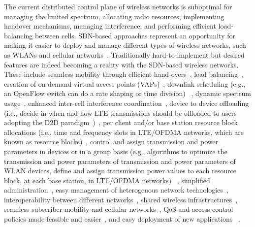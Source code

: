 The current distributed control plane of wireless networks is suboptimal for managing the limited 
spectrum, allocating radio resources, implementing handover mechanisms, managing interference, and performing efficient load-balancing between cells.
SDN-based approaches represent an opportunity for making it easier to deploy and manage different types of wireless networks, such as WLANs and cellular 
networks~\cite{schulz-zander2014-atc,yap2010-1,ali-ahmad2013,gudipati2013,li2012,jin2013}.
Traditionally hard-to-implement but desired features are indeed becoming a reality with the SDN-based wireless networks. 
These include seamless mobility through efficient hand-overs~\cite{schulz-zander2014-atc,dely2011,li2012}, load balancing~\cite{schulz-zander2014-atc,gudipati2013}, creation of on-demand virtual access points (VAPs)~\cite{schulz-zander2014-atc,vestin2013}, downlink scheduling (e.g., an OpenFlow switch can do a rate shaping or time division) ~\cite{vestin2013}, dynamic spectrum usage~\cite{vestin2013}, enhanced inter-cell 
interference coordination~\cite{vestin2013,li2012}, device to device offloading (i.e., decide in when and how LTE transmissions should be offloaded to users adopting the D2D paradigm~\cite{yang2013d2d})~\cite{ali-ahmad2013}, per client and/or base station resource block allocations (i.e.,  time and frequency slots in LTE/OFDMA networks, which are known as resource blocks)~\cite{gudipati2013,ali-ahmad2013,jin2013}, control and assign 
transmission and power parameters in devices or in a group basis (e.g., algorithms to optimize the transmission and power parameters of
transmission and power parameters of WLAN devices, define and assign transmission power values to each resource block, at each base station, in LTE/OFDMA networks) ~\cite{ali-ahmad2013,gudipati2013}, simplified administration~\cite{schulz-zander2014-atc,yap2010-1,gudipati2013}, easy management of heterogenous network technologies~\cite{yap2010-1,gudipati2013,yap2010-2}, interoperability between different networks~\cite{yap2010-2,jin2013}, shared wireless infrastructures~\cite{yap2010-2}, seamless subscriber mobility and cellular networks~\cite{li2012}, QoS and access control policies made feasible and easier~\cite{li2012,jin2013}, and easy deployment of new applications 
~\cite{schulz-zander2014-atc,gudipati2013,yap2010-2}. 

